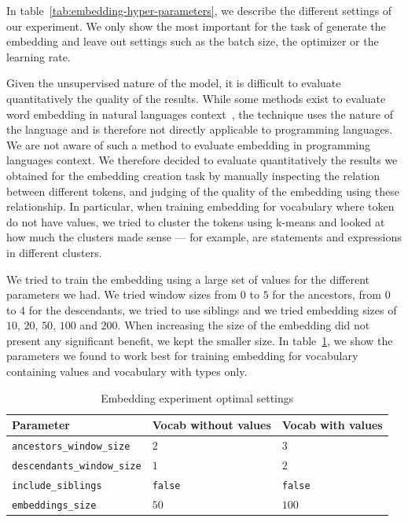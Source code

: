In table~\ref{tab:embedding-hyper-parameters}, we describe the different
settings of our experiment. We only show the most important
for the task of generate the embedding and leave out settings such as the batch
size, the optimizer or the learning rate.

Given the unsupervised nature of the model, it is difficult to evaluate
quantitatively the quality of the results. While some methods exist to evaluate
word embedding in natural languages context~\cite{schnabel2015eval}, the
technique uses the nature of the language and is therefore not directly
applicable to programming languages. We are not aware of such a method to
evaluate embedding in programming languages context. We therefore decided to
evaluate quantitatively the results we obtained for the embedding creation task
by manually inspecting the relation between different tokens, and judging of the
quality of the embedding using these relationship. In particular, when training
embedding for vocabulary where token do not have values, we tried to cluster the
tokens using k-means\cite{Kanungo:2002:EKC:628329.628801} and looked at how much
the clusters made sense --- for example, are statements and expressions in
different clusters.

We tried to train the embedding using a large set of values for the different
parameters we had. We tried window sizes from $0$ to $5$ for the ancestors, from
$0$ to $4$ for the descendants, we tried to use siblings and we tried embedding
sizes of $10$, $20$, $50$, $100$ and $200$. When increasing the size of the
embedding did not present any significant benefit, we kept the smaller size. In
table~\ref{tab:no-value-embedding-params}, we show the parameters we found to
work best for training embedding for vocabulary containing values and vocabulary
with types only.

\begin{table}
  \caption{\label{tab:no-value-embedding-params}Embedding experiment optimal settings}
  \begin{center}
    \begin{tabularx}{\linewidth}{X X X}
      \toprule
      Parameter & Vocab without values & Vocab with values\\
      \toprule
      \lstinline{ancestors_window_size} & $2$ & $3$\\
      \lstinline{descendants_window_size} & $1$ & $2$\\
      \lstinline{include_siblings} & \lstinline{false} & \lstinline{false}\\
      \lstinline{embeddings_size} & $50$ & $100$\\
      \bottomrule
    \end{tabularx}
  \end{center}
\end{table}

